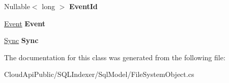\begin{DoxyCompactItemize}
\item 
\hypertarget{class_cloud_api_public_1_1_s_q_l_indexer_1_1_sql_model_1_1_file_system_object_a57140c97e42178219ea2bf68aec55ddd}{Nullable$<$ long $>$ {\bfseries Event\-Id}}\label{class_cloud_api_public_1_1_s_q_l_indexer_1_1_sql_model_1_1_file_system_object_a57140c97e42178219ea2bf68aec55ddd}

\item 
\hypertarget{class_cloud_api_public_1_1_s_q_l_indexer_1_1_sql_model_1_1_file_system_object_aebf9171780e3ae01bf0c3aca68d1cf78}{\hyperlink{class_cloud_api_public_1_1_s_q_l_indexer_1_1_sql_model_1_1_event}{Event} {\bfseries Event}}\label{class_cloud_api_public_1_1_s_q_l_indexer_1_1_sql_model_1_1_file_system_object_aebf9171780e3ae01bf0c3aca68d1cf78}

\item 
\hypertarget{class_cloud_api_public_1_1_s_q_l_indexer_1_1_sql_model_1_1_file_system_object_ac417ce3c01aa246888f9cb739810ad3b}{\hyperlink{class_cloud_api_public_1_1_s_q_l_indexer_1_1_sql_model_1_1_sync}{Sync} {\bfseries Sync}}\label{class_cloud_api_public_1_1_s_q_l_indexer_1_1_sql_model_1_1_file_system_object_ac417ce3c01aa246888f9cb739810ad3b}

\end{DoxyCompactItemize}


The documentation for this class was generated from the following file\-:\begin{DoxyCompactItemize}
\item 
Cloud\-Api\-Public/\-S\-Q\-L\-Indexer/\-Sql\-Model/File\-System\-Object.\-cs\end{DoxyCompactItemize}
